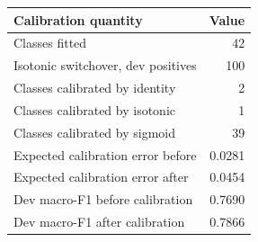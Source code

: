 \begingroup\small\setlength{\tabcolsep}{4pt}
\begin{tabular}{lr}
\toprule
\textbf{Calibration quantity} & \textbf{Value} \\
\midrule
Classes fitted & 42 \\  %
Isotonic switchover, dev positives & 100 \\  %
Classes calibrated by identity & 2 \\  %
Classes calibrated by isotonic & 1 \\  %
Classes calibrated by sigmoid & 39 \\  %
Expected calibration error before & 0.0281 \\  %
Expected calibration error after & 0.0454 \\  %
Dev macro-F1 before calibration & 0.7690 \\  %
Dev macro-F1 after calibration & 0.7866 \\  %
\bottomrule
\end{tabular}
\endgroup
\par\smallskip{}
